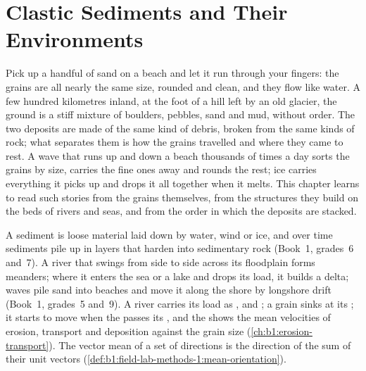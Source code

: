 \chapter{Clastic Sediments and Their Environments}\label{ch:b1:clastic-sediments}

Pick up a handful of sand on a beach and let it run through your fingers: the
grains are all nearly the same size, rounded and clean, and they flow like
water. A few hundred kilometres inland, at the foot of a hill left by an old
glacier, the ground is a stiff mixture of boulders, pebbles, sand and mud,
without order. The two deposits are made of the same kind of debris, broken
from the same kinds of rock; what separates them is how the grains travelled and
where they came to rest. A wave that runs up and down a beach thousands of
times a day sorts the grains by size, carries the fine ones away and rounds the
rest; ice carries everything it picks up and drops it all together when it
melts. This chapter learns to read such stories from the grains themselves,
from the structures they build on the beds of rivers and seas, and from the
order in which the deposits are stacked.

\begin{recall}
A sediment is loose material laid down by water, wind or ice, and over time
sediments pile up in layers that harden into sedimentary rock (Book~1, grades~6
and~7). A river that swings from side to side across its floodplain forms
meanders; where it enters the sea or a lake and drops its load, it builds a
delta; waves pile sand into beaches and move it along the shore by longshore
drift (Book~1, grades~5 and~9). A river carries its load as ,  and ; a grain sinks at its ; it starts to
move when the  passes its , and the
 shows the mean velocities of erosion, transport and deposition
against the grain size (\cref{ch:b1:erosion-transport}). The vector mean of a
set of directions is the direction of the sum of their unit vectors
(\cref{def:b1:field-lab-methods-1:mean-orientation}).
\end{recall}

